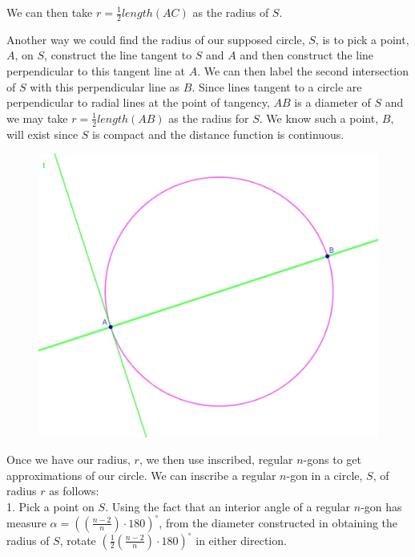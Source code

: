 \documentclass[11pt]{amsart}
\theoremstyle{plain}
\theoremstyle{definition}
\theoremstyle{remark}
\begin{document}
We can then take \(r = \frac{1}{2}length(AC)\) as the radius of \(S\).






Another way we could find the radius of our supposed circle, \(S\), is to pick a point, \(A\), on \(S\), construct the line tangent to \(S\) and \(A\) and then construct the line perpendicular to this tangent line at \(A\).  We can then label the second intersection of \(S\) with this perpendicular line as \(B\).  Since lines tangent to a circle are perpendicular to  radial lines at the point of tangency, \(AB\) is a diameter of \(S\) and we may take \(r=\frac{1}{2}length(AB)\) as the radius for \(S\).  We know such a point, \(B\), will exist since \(S\) is compact and the distance function is continuous.
\begin{center}
	\begin{figure}[h]
		\includegraphics[scale=0.5]{circle_2_1.jpg}
	\end{figure}
\end{center}
Once we have our radius, \(r\), we then use inscribed, regular \(n\)-gons to get approximations of our circle. We can inscribe a regular \(n\)-gon in a circle, \(S\), of radius \(r\) as follows:
\\[1\baselineskip]
1. Pick a point on \(S\).  Using the fact that an interior angle of a regular \(n\)-gon has measure \(\alpha = ((\frac{n-2}{n})\cdot 180)^{\circ}\), from the diameter constructed in obtaining the radius of \(S\), rotate \((\frac{1}{2}(\frac{n-2}{n})\cdot 180)^{\circ}\) in either direction.
\end{document}
